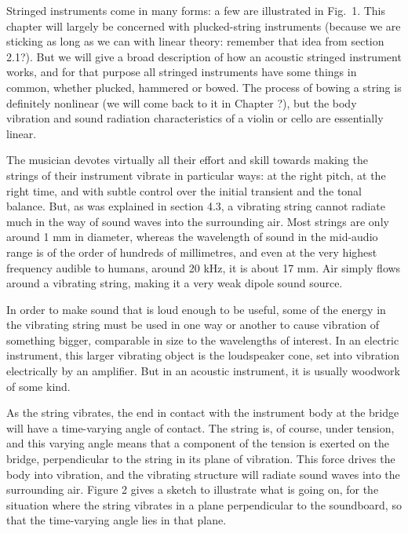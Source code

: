   Stringed instruments come in many forms: a few are illustrated in Fig.\ 1. 
  This chapter will largely be concerned with plucked-string instruments 
  (because we are sticking as long as we can with linear theory: remember that 
  idea from section 2.1?). But we will give a broad description of how an 
  acoustic stringed instrument works, and for that purpose all stringed 
  instruments have some things in common, whether plucked, hammered or bowed. 
  The process of bowing a string is definitely nonlinear (we will come back to 
  it in Chapter ?), but the body vibration and sound radiation characteristics 
  of a violin or cello are essentially linear. 

  The musician devotes virtually all their effort and skill towards making the 
  strings of their instrument vibrate in particular ways: at the right pitch, 
  at the right time, and with subtle control over the initial transient and the 
  tonal balance. But, as was explained in section 4.3, a vibrating string 
  cannot radiate much in the way of sound waves into the surrounding air. Most 
  strings are only around 1 mm in diameter, whereas the wavelength of sound in 
  the mid-audio range is of the order of hundreds of millimetres, and even at 
  the very highest frequency audible to humans, around 20 kHz, it is about 17 
  mm. Air simply flows around a vibrating string, making it a very weak dipole 
  sound source. 

  In order to make sound that is loud enough to be useful, some of the energy 
  in the vibrating string must be used in one way or another to cause vibration 
  of something bigger, comparable in size to the wavelengths of interest. In an 
  electric instrument, this larger vibrating object is the loudspeaker cone, 
  set into vibration electrically by an amplifier. But in an acoustic 
  instrument, it is usually woodwork of some kind. 

  As the string vibrates, the end in contact with the instrument body at the 
  bridge will have a time-varying angle of contact. The string is, of course, 
  under tension, and this varying angle means that a component of the tension 
  is exerted on the bridge, perpendicular to the string in its plane of 
  vibration. This force drives the body into vibration, and the vibrating 
  structure will radiate sound waves into the surrounding air. Figure 2 gives a 
  sketch to illustrate what is going on, for the situation where the string 
  vibrates in a plane perpendicular to the soundboard, so that the time-varying 
  angle lies in that plane. 

